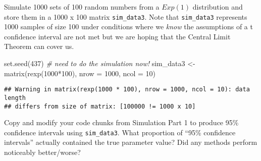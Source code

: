 \documentclass[
]{article}
\newenvironment{Shaded}{\begin{snugshade}}{\end{snugshade}}
\newcommand{\AttributeTok}[1]{\textcolor[rgb]{0.77,0.63,0.00}{#1}}
\newcommand{\CommentTok}[1]{\textcolor[rgb]{0.56,0.35,0.01}{\textit{#1}}}
\newcommand{\ControlFlowTok}[1]{\textcolor[rgb]{0.13,0.29,0.53}{\textbf{#1}}}
\newcommand{\DecValTok}[1]{\textcolor[rgb]{0.00,0.00,0.81}{#1}}
\newcommand{\FunctionTok}[1]{\textcolor[rgb]{0.00,0.00,0.00}{#1}}
\newcommand{\NormalTok}[1]{#1}
\newcommand{\OtherTok}[1]{\textcolor[rgb]{0.56,0.35,0.01}{#1}}
\newcommand{\SpecialCharTok}[1]{\textcolor[rgb]{0.00,0.00,0.00}{#1}}
\newcommand{\StringTok}[1]{\textcolor[rgb]{0.31,0.60,0.02}{#1}}
\begin{document}
Simulate 1000 sets of 100 random numbers from a \(Exp(1)\) distribution
and store them in a 1000 x 100 matrix \texttt{sim\_data3}. Note that
\texttt{sim\_data3} represents 1000 samples of size 100 under conditions
where we \emph{know} the assumptions of a t confidence interval are not
met but we are hoping that the Central Limit Theorem can cover us.

\begin{Shaded}
\begin{Highlighting}[]
\FunctionTok{set.seed}\NormalTok{(}\DecValTok{437}\NormalTok{)}
\CommentTok{\# need to do the simulation now!}
\NormalTok{sim\_data3 }\OtherTok{\textless{}{-}} \FunctionTok{matrix}\NormalTok{(}\FunctionTok{rexp}\NormalTok{(}\DecValTok{1000}\SpecialCharTok{*}\DecValTok{100}\NormalTok{), }\AttributeTok{nrow =} \DecValTok{1000}\NormalTok{, }\AttributeTok{ncol =} \DecValTok{10}\NormalTok{)}
\end{Highlighting}
\end{Shaded}

\begin{verbatim}
## Warning in matrix(rexp(1000 * 100), nrow = 1000, ncol = 10): data length
## differs from size of matrix: [100000 != 1000 x 10]
\end{verbatim}

Copy and modify your code chunks from Simulation Part 1 to produce 95\%
confidence intervals using \texttt{sim\_data3}. What proportion of
``95\% confidence intervals'' actually contained the true parameter
value? Did any methods perform noticeably better/worse?

\begin{Shaded}
\end{Shaded}
\end{document}
